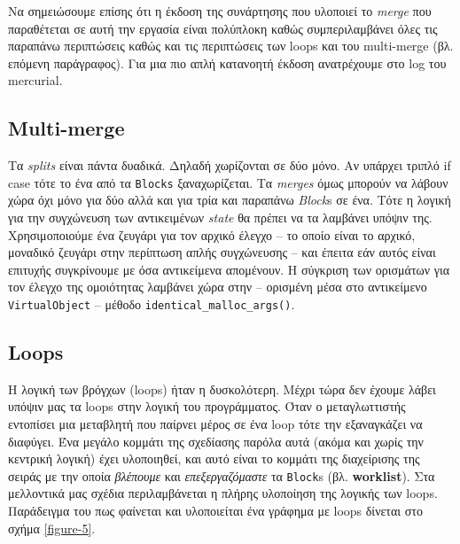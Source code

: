 Να σημειώσουμε επίσης ότι η έκδοση της συνάρτησης που υλοποιεί το \textit{merge}
που παραθέτεται σε αυτή την εργασία είναι πολύπλοκη καθώς συμπεριλαμβάνει όλες
τις παραπάνω περιπτώσεις καθώς και τις περιπτώσεις των loops και του multi-merge
(βλ. επόμενη παράγραφος). Για μια πιο απλή κατανοητή έκδοση ανατρέχουμε στο log
του mercurial.

\subsection{Multi-merge}

Τα \textit{splits} είναι πάντα δυαδικά. Δηλαδή χωρίζονται σε δύο μόνο. Αν
υπάρχει τριπλό if case τότε το ένα από τα \texttt{Blocks} ξαναχωρίζεται. Τα
\textit{merges} όμως μπορούν να λάβουν χώρα όχι μόνο για δύο αλλά και για τρία
και παραπάνω \textit{Block}s σε ένα. Τότε η λογική για την συγχώνευση των
αντικειμένων \textit{state} θα πρέπει να τα λαμβάνει υπόψιν της.
Χρησιμοποιούμε ένα ζευγάρι για τον αρχικό έλεγχο – το οποίο είναι το αρχικό,
μοναδικό ζευγάρι στην περίπτωση απλής συγχώνευσης – και έπειτα εάν αυτός είναι
επιτυχής συγκρίνουμε με όσα αντικείμενα απομένουν. Η σύγκριση των ορισμάτων
για τον έλεγχο της ομοιότητας λαμβάνει χώρα στην – ορισμένη μέσα στο
αντικείμενο \texttt{VirtualObject} – μέθοδο \texttt{identical\_malloc\_args()}.

\subsection{Loops}

Η λογική των βρόγχων (loops) ήταν η δυσκολότερη. Μέχρι τώρα δεν έχουμε λάβει
υπόψιν μας τα loops στην λογική του προγράμματος. Όταν ο μεταγλωττιστής
εντοπίσει μια μεταβλητή που παίρνει μέρος σε ένα loop τότε την εξαναγκάζει να
διαφύγει. Ένα μεγάλο κομμάτι της σχεδίασης παρόλα αυτά (ακόμα και χωρίς την
κεντρική λογική) έχει υλοποιηθεί, και αυτό είναι το κομμάτι της διαχείρισης της
σειράς με την οποία \textit{βλέπουμε} και \textit{επεξεργαζόμαστε} τα
\texttt{Block}s (βλ. \textbf{worklist}). Στα μελλοντικά μας σχέδια
περιλαμβάνεται η πλήρης υλοποίηση της λογικής των loops. Παράδειγμα του πως
φαίνεται και υλοποιείται ένα γράφημα με loops δίνεται στο σχήμα \ref{figure-5}.

